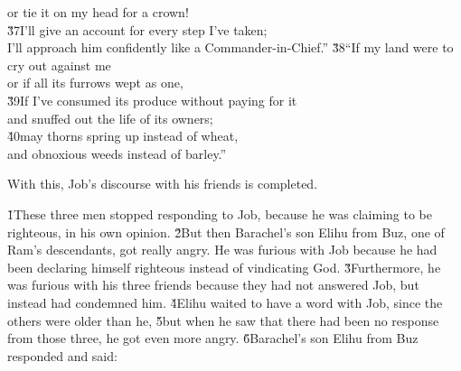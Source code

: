 \begin{poetry}
\poemlll       or tie it on my head for a crown! \\
\poeml \v{37}I'll give an account for every step I've taken; \\
\poemll    I'll approach him confidently like a Commander-in-Chief.''
\poeml \v{38}``If my land were to cry out against me \\
\poemll    or if all its furrows wept as one, \\
\poeml \v{39}If I've consumed its produce without paying for it \\
\poemll    and snuffed out the life of its owners; \\
\poeml \v{40}may thorns spring up instead of wheat, \\
\poemll    and obnoxious weeds instead of barley.''
\end{poetry}

With this, Job's discourse with his friends is completed.

\v{1}These three men stopped responding to Job, because he was claiming to be righteous, in his own opinion. \v{2}But then Barachel's son Elihu from Buz, one of Ram's descendants, got really angry. He was furious with Job because he had been declaring himself righteous instead of vindicating God. \v{3}Furthermore, he was furious with his three friends because they had not answered Job, but instead had condemned him. \v{4}Elihu waited to have a word with Job, since the others were older than he, \v{5}but when he saw that there had been no response from those three, he got even more angry. \v{6}Barachel's son Elihu from Buz responded and said:

